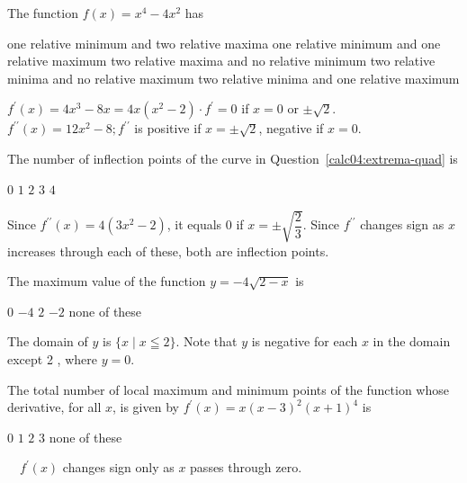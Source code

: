\question\label{calc04:extrema-quad}
The function $f(x)=x^{4}-4 x^{2}$ has
\begin{choices}
  \choice one relative minimum and two relative maxima
  \choice one relative minimum and one relative maximum
  \choice two relative maxima and no relative minimum
  \choice two relative minima and no relative maximum
  \CorrectChoice two relative minima and one relative maximum
\end{choices}
\begin{solution}
$f^{\prime}(x)=4 x^{3}-8 x=4 x\left(x^{2}-2\right) \cdot f^{\prime}=0$ if $x=0$ or $\pm \sqrt{2}$.
$f^{\prime \prime}(x)=12 x^{2}-8 ; f^{\prime \prime}$ is positive if $x= \pm \sqrt{2}$, negative if $x=0$.
\end{solution}


\question
The number of inflection points of the curve in Question~\ref{calc04:extrema-quad} is
\begin{choices}
  \choice $0$
  \choice $1$
  \CorrectChoice $2$
  \choice $3$
  \choice $4$
\end{choices}
\begin{solution}
Since $f^{\prime \prime}(x)=4\left(3 x^{2}-2\right)$, it equals 0 if $x= \pm \sqrt{\dfrac{2}{3}}$. Since $f^{\prime \prime}$ changes sign as $x$ increases through each of these, both are inflection points.
\end{solution}





\newpage



\question
The maximum value of the function $y=-4 \sqrt{2-x}$ is
\begin{choices}
  \CorrectChoice $0$
  \choice $-4$
  \choice $2$
  \choice $-2$
  \choice none of these
\end{choices}
\begin{solution}
The domain of $y$ is $\{x \mid x \leqq 2\}$. Note that $y$ is negative for each $x$ in the domain except 2 , where $y=0$.
\end{solution}

\question
The total number of local maximum and minimum points of the function whose derivative, for all $x$, is given by $f^{\prime}(x)=x(x-3)^{2}(x+1)^{4}$ is
\begin{choices}
  \choice $0$
  \CorrectChoice $1$
  \choice $2$
  \choice $3$
  \choice none of these
\end{choices}
\begin{solution}
$\quad f^{\prime}(x)$ changes sign only as $x$ passes through zero.
\end{solution}

